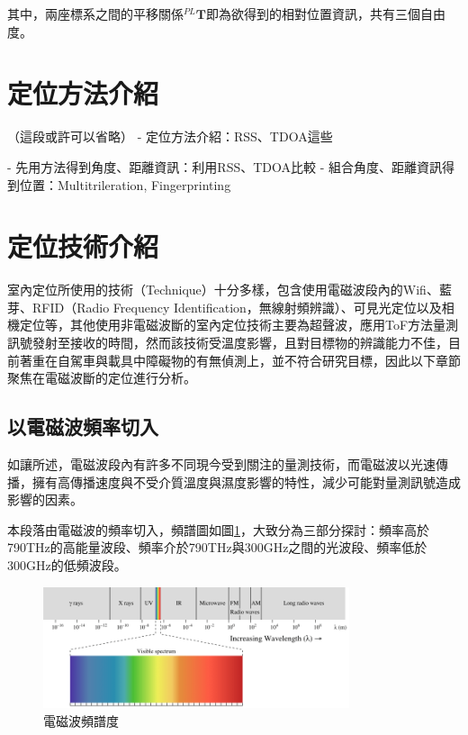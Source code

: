    其中，兩座標系之間的平移關係$^{PL}\boldsymbol{T}$即為欲得到的相對位置資訊，共有三個自由度。

 



\section{定位方法介紹}
（這段或許可以省略）
    - 定位方法介紹：RSS、TDOA這些
    
    
    - 先用方法得到角度、距離資訊：利用RSS、TDOA比較
    - 組合角度、距離資訊得到位置：Multitrileration, Fingerprinting

\section{定位技術介紹}

    室內定位所使用的技術（Technique）十分多樣，包含使用電磁波段內的Wifi、藍芽、RFID（Radio Frequency Identification，無線射頻辨識）、可見光定位以及相機定位等，其他使用非電磁波斷的室內定位技術主要為超聲波，應用ToF方法量測訊號發射至接收的時間，然而該技術受溫度影響，且對目標物的辨識能力不佳，目前著重在自駕車與載具中障礙物的有無偵測上\cite{survey_ultrasonic}，並不符合研究目標，因此以下章節聚焦在電磁波斷的定位進行分析。

    \subsection{以電磁波頻率切入}

        如讓所述，電磁波段內有許多不同現今受到關注的量測技術，而電磁波以光速傳播，擁有高傳播速度與不受介質溫度與濕度影響的特性，減少可能對量測訊號造成影響的因素。

        本段落由電磁波的頻率切入，頻譜圖如圖\ref{pic:spectrum}，大致分為三部分探討：頻率高於790THz的高能量波段、頻率介於790THz與300GHz之間的光波段、頻率低於300GHz的低頻波段\cite{book_electromagnetic}。

        \begin{figure}[ht]
            \centering
            \includegraphics[width=9cm]{ch2pic/electro_spectrum.png}
            \caption{電磁波頻譜度\cite{Spectrum}}
            \label{pic:spectrum}
        \end{figure}
        
